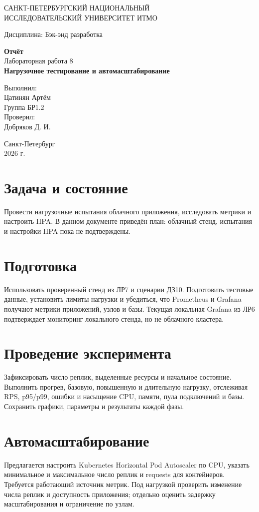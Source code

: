 \documentclass[14pt,a4paper]{extarticle}
\begin{document}
\begin{titlepage}\begin{center}
САНКТ-ПЕТЕРБУРГСКИЙ НАЦИОНАЛЬНЫЙ\\ ИССЛЕДОВАТЕЛЬСКИЙ УНИВЕРСИТЕТ ИТМО
\vspace{1.5cm}

Дисциплина: Бэк-энд разработка
\vspace{1.5cm}

\textbf{Отчёт}\\[0.5cm]
Лабораторная работа 8\\[0.5cm]
\textbf{Нагрузочное тестирование и автомасштабирование}
\vfill
\begin{flushright}Выполнил:\\ Цатинян Артём\\ Группа БР1.2\\[0.8cm] Проверил:\\ Добряков Д. И.\end{flushright}
\vfill Санкт-Петербург\\ 2026 г.\end{center}\end{titlepage}
\section{Задача и состояние}
Провести нагрузочные испытания облачного приложения, исследовать метрики и настроить HPA. В данном документе приведён план: облачный стенд, испытания и настройки HPA пока не подтверждены.
\section{Подготовка}
Использовать проверенный стенд из ЛР7 и сценарии ДЗ10. Подготовить тестовые данные, установить лимиты нагрузки и убедиться, что Prometheus и Grafana получают метрики приложений, узлов и базы. Текущая локальная Grafana из ЛР6 подтверждает мониторинг локального стенда, но не облачного кластера.
\section{Проведение эксперимента}
Зафиксировать число реплик, выделенные ресурсы и начальное состояние. Выполнить прогрев, базовую, повышенную и длительную нагрузку, отслеживая RPS, p95/p99, ошибки и насыщение CPU, памяти, пула подключений и базы. Сохранить графики, параметры и результаты каждой фазы.
\section{Автомасштабирование}
Предлагается настроить Kubernetes Horizontal Pod Autoscaler по CPU, указать минимальное и максимальное число реплик и requests для контейнеров. Требуется работающий источник метрик. Под нагрузкой проверить изменение числа реплик и доступность приложения; отдельно оценить задержку масштабирования и ограничение по узлам.
\end{document}
